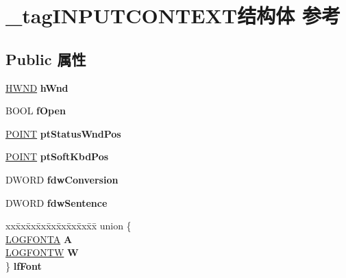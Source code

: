 \hypertarget{struct__tag_i_n_p_u_t_c_o_n_t_e_x_t}{}\section{\+\_\+tag\+I\+N\+P\+U\+T\+C\+O\+N\+T\+E\+X\+T结构体 参考}
\label{struct__tag_i_n_p_u_t_c_o_n_t_e_x_t}
\subsection*{Public 属性}
\begin{DoxyCompactItemize}
\item 
\mbox{\label{struct__tag_i_n_p_u_t_c_o_n_t_e_x_t_aa492d8b523751abc7a947a15349050af}} 
\hyperlink{interfacevoid}{H\+W\+ND} {\bfseries h\+Wnd}
\item 
\mbox{\label{struct__tag_i_n_p_u_t_c_o_n_t_e_x_t_add00d007991adc4294ef5e718dfc5d47}} 
B\+O\+OL {\bfseries f\+Open}
\item 
\mbox{\label{struct__tag_i_n_p_u_t_c_o_n_t_e_x_t_a18265620b630f2c0abdb5f000a778805}} 
\hyperlink{structtag_p_o_i_n_t}{P\+O\+I\+NT} {\bfseries pt\+Status\+Wnd\+Pos}
\item 
\mbox{\label{struct__tag_i_n_p_u_t_c_o_n_t_e_x_t_a81d44ace724d41c953c88206b3088209}} 
\hyperlink{structtag_p_o_i_n_t}{P\+O\+I\+NT} {\bfseries pt\+Soft\+Kbd\+Pos}
\item 
\mbox{\label{struct__tag_i_n_p_u_t_c_o_n_t_e_x_t_aaf662cf0f67d75e4448ec999591730dc}} 
D\+W\+O\+RD {\bfseries fdw\+Conversion}
\item 
\mbox{\label{struct__tag_i_n_p_u_t_c_o_n_t_e_x_t_ad982351cf0956db59c422e2a67733737}} 
D\+W\+O\+RD {\bfseries fdw\+Sentence}
\item 
\mbox{\label{struct__tag_i_n_p_u_t_c_o_n_t_e_x_t_a145cd3ad0bb410f5c4f065a52a11d4c2}} 
\begin{tabbing}
xx\=xx\=xx\=xx\=xx\=xx\=xx\=xx\=xx\=\kill
union \{\\
\>\hyperlink{struct_l_o_g_f_o_n_t_a}{LOGFONTA} {\bfseries A}\\
\>\hyperlink{struct_l_o_g_f_o_n_t_w}{LOGFONTW} {\bfseries W}\\
\} {\bfseries lfFont}\\


\end{tabbing}
\end{DoxyCompactItemize}

